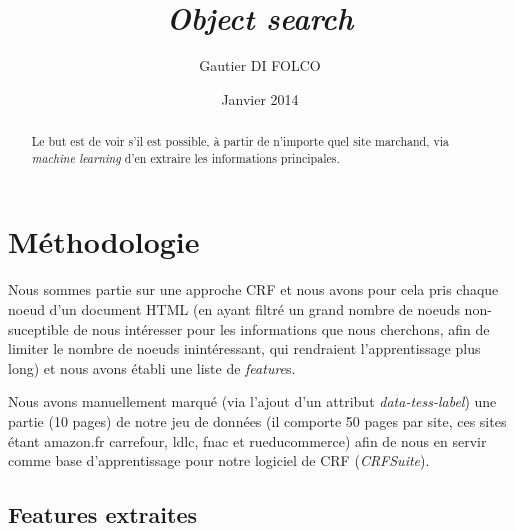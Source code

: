 \documentclass{article}
\title{\emph{Object search}}
\author{Gautier DI FOLCO}
\date{Janvier 2014}
\begin{document}
\maketitle
\tableofcontents

\begin{abstract}
Le but est de voir s'il est possible, à partir de n'importe quel site marchand,
via \emph{machine learning} d'en extraire les informations principales.
\end{abstract}

\section{Méthodologie}
Nous sommes partie sur une approche CRF et nous avons pour cela pris chaque noeud
d'un document HTML (en ayant filtré un grand nombre de noeuds non-suceptible de
nous intéresser pour les informations que nous cherchons, afin de limiter le nombre de
noeuds inintéressant, qui rendraient l'apprentissage plus long) et nous avons établi
une liste de \emph{feature}s.

Nous avons manuellement marqué (via l'ajout d'un attribut \emph{data-tess-label})
une partie (10 pages) de notre jeu de données (il comporte 50 pages par site,
ces sites étant amazon.fr carrefour, ldlc, fnac et rueducommerce) afin de nous
en servir comme base d'apprentissage pour notre logiciel de CRF (\emph{CRFSuite}).

\subsection{Features extraites}
\end{document}
